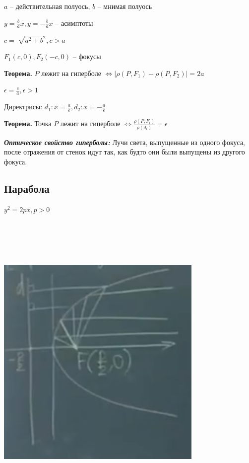 \vspace{\baselineskip}
$a$ -- действительная полуось, $b$ -- мнимая полуось

\vspace{\baselineskip}
$y = \frac{b}{a}x, y = - \frac{b}{a}x$ -- асимптоты

$c = \sqrt[]{a^2 + b^2}, c > a$

$F_1(c, 0), F_2(-c, 0)$ -- фокусы

\vspace{\baselineskip}
\textbf{Теорема.} $P$ лежит на гиперболе $\Leftrightarrow |\rho(P, F_1) - \rho(P, F_2)| = 2a$

\vspace{\baselineskip}
$\epsilon = \frac{c}{a}, \epsilon > 1$

\vspace{\baselineskip}
Директрисы: $d_1: x = \frac{a}{\epsilon}, d_2: x = -\frac{a}{\epsilon}$

\vspace{\baselineskip}
\textbf{Теорема.}  Точка $P$ лежит на гиперболе $\Leftrightarrow \frac{\rho(P, F_i)}{\rho(d_i)} = \epsilon$

\vspace{\baselineskip}
\textbf{\textit{Оптическое свойство гиперболы:}} Лучи света, выпущенные из одного фокуса, после отражения от стенок идут так, как будто они были выпущены из другого фокуса.

\subsection{Парабола}

$y^2 = 2px, p>0$

\vspace{\baselineskip}
\includegraphics[width=10cm,height=15cm,keepaspectratio]{example5.jpg}

